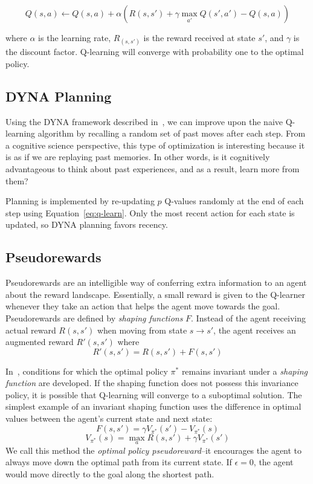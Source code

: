 \documentclass[notitlepage]{article}
\begin{document}
\begin{equation}
Q(s,a) \leftarrow Q(s,a) + \alpha (R(s, s') + \gamma \max_{a'} Q(s', a') - Q(s,a))
\label{eq:q-learn}
\end{equation}

where $\alpha$ is the learning rate, $R_(s, s')$ is the reward received at state $s'$, and $\gamma$ is the discount factor. Q-learning will converge with probability one to the optimal policy. 

\subsection*{DYNA Planning}

Using the DYNA framework described in~\cite{sutton1998reinforcement}, we can improve upon the naive Q-learning algorithm by recalling a random set of past moves after each step. From a cognitive science perspective, this type of optimization is interesting because it is as if we are replaying past memories. In other words, is it cognitively advantageous to think about past experiences, and as a result, learn more from them? 

Planning is implemented by re-updating $p$ Q-values randomly at the end of each step using Equation~\ref{eq:q-learn}. Only the most recent action for each state is updated, so DYNA planning favors recency.

\subsection*{Pseudorewards}

Pseudorewards are an intelligible way of conferring extra information to an agent about the reward landscape. Essentially, a small reward is given to the Q-learner whenever they take an action that helps the agent move towards the goal. Pseudorewards are defined by \textit{shaping functions} $F$. Instead of the agent receiving actual reward $R(s, s')$ when moving from state $s \rightarrow s'$, the agent receives an augmented reward $R'(s, s')$ where
\begin{equation}
R'(s, s') = R(s, s') + F(s, s')
\end{equation} 

 In~\cite{ng1999policy}, conditions for which the optimal policy $\pi^*$ remains invariant under a \textit{shaping function} are developed. If the shaping function does not possess this invariance policy, it is possible that Q-learning will converge to a suboptimal solution. The simplest example of an invariant shaping function uses the difference in optimal values between the agent's current state and next state:
\begin{equation}
F(s, s') = \gamma V_{\pi^*}(s') - V_{\pi^*}(s) 
\end{equation}
\begin{equation}
V_{\pi^*}(s) =  \max_{a} R(s, s') + \gamma V_{\pi^*}(s')
\end{equation}
We call this method the \textit{optimal policy pseudoreward}--it encourages the agent to always move down the optimal path from its current state. If $\epsilon = 0$, the agent would move directly to the goal along the shortest path.
\end{document}

